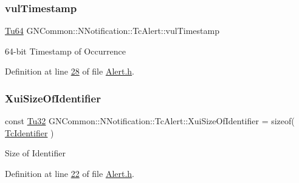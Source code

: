\subsubsection{\texorpdfstring{vul\+Timestamp}{vulTimestamp}}
{\footnotesize\ttfamily \mbox{\hyperlink{namespace_g_n_common_a9404ee6090c788ae70aebd1436ceb97d}{Tu64}} G\+N\+Common\+::\+N\+Notification\+::\+Tc\+Alert\+::vul\+Timestamp\hspace{0.3cm}{\ttfamily [protected]}}

64-\/bit Timestamp of Occurrence 

Definition at line \mbox{\hyperlink{_alert_8h_source_l00028}{28}} of file \mbox{\hyperlink{_alert_8h_source}{Alert.\+h}}.

\mbox{\label{class_g_n_common_1_1_n_notification_1_1_tc_alert_a44f63050a2f1c7a4876a31ce2ffd2d06}} 
\subsubsection{\texorpdfstring{Xui\+Size\+Of\+Identifier}{XuiSizeOfIdentifier}}
{\footnotesize\ttfamily const \mbox{\hyperlink{namespace_g_n_common_a941b527ef318f318aed7903dc832b7e4}{Tu32}} G\+N\+Common\+::\+N\+Notification\+::\+Tc\+Alert\+::\+Xui\+Size\+Of\+Identifier = sizeof( \mbox{\hyperlink{class_g_n_common_1_1_n_notification_1_1_tc_identifier}{Tc\+Identifier}} )\hspace{0.3cm}{\ttfamily [static]}}

Size of Identifier 

Definition at line \mbox{\hyperlink{_alert_8h_source_l00022}{22}} of file \mbox{\hyperlink{_alert_8h_source}{Alert.\+h}}.

\mbox{\label{class_g_n_common_1_1_n_notification_1_1_tc_alert_a59f856e0a33731ee0c235271bb013a34}} 
